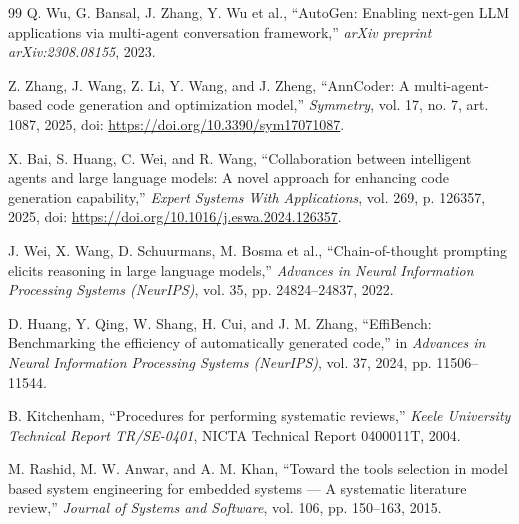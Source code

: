 \documentclass[10pt,a4paper]{article}
\begin{document}
\begin{thebibliography}{99}
Q. Wu, G. Bansal, J. Zhang, Y. Wu et al., ``AutoGen: Enabling next-gen LLM applications via multi-agent conversation framework,'' \textit{arXiv preprint arXiv:2308.08155}, 2023.

Z. Zhang, J. Wang, Z. Li, Y. Wang, and J. Zheng, ``AnnCoder: A multi-agent-based code generation and optimization model,'' \textit{Symmetry}, vol. 17, no. 7, art. 1087, 2025, doi: \url{https://doi.org/10.3390/sym17071087}.

X. Bai, S. Huang, C. Wei, and R. Wang, ``Collaboration between intelligent agents and large language models: A novel approach for enhancing code generation capability,'' \textit{Expert Systems With Applications}, vol. 269, p. 126357, 2025, doi: \url{https://doi.org/10.1016/j.eswa.2024.126357}.

J. Wei, X. Wang, D. Schuurmans, M. Bosma et al., ``Chain-of-thought prompting elicits reasoning in large language models,'' \textit{Advances in Neural Information Processing Systems (NeurIPS)}, vol. 35, pp. 24824--24837, 2022.

D. Huang, Y. Qing, W. Shang, H. Cui, and J. M. Zhang, ``EffiBench: Benchmarking the efficiency of automatically generated code,'' in \textit{Advances in Neural Information Processing Systems (NeurIPS)}, vol. 37, 2024, pp. 11506--11544.

B. Kitchenham, ``Procedures for performing systematic reviews,'' \textit{Keele University Technical Report TR/SE-0401}, NICTA Technical Report 0400011T, 2004.

M. Rashid, M. W. Anwar, and A. M. Khan, ``Toward the tools selection in model based system engineering for embedded systems --- A systematic literature review,'' \textit{Journal of Systems and Software}, vol. 106, pp. 150--163, 2015.

\end{thebibliography}
\end{document}
